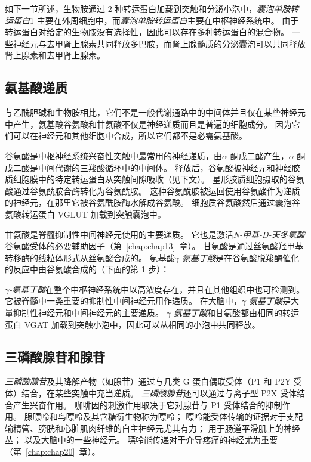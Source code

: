 如下一节所述，生物胺通过 2 种转运蛋白加载到突触和分泌小泡中，\textit{囊泡单胺转运蛋白}1 主要在外周细胞中，而\textit{囊泡单胺转运蛋白}主要在中枢神经系统中。
由于转运蛋白对给定的生物胺没有选择性，因此可以存在多种转运蛋白的混合物。
一些神经元与去甲肾上腺素共同释放多巴胺，而肾上腺髓质的分泌囊泡可以共同释放肾上腺素和去甲肾上腺素。



\subsection{氨基酸递质}

与乙酰胆碱和生物胺相比，它们不是一般代谢通路中的中间体并且仅在某些神经元中产生，氨基酸谷氨酸和甘氨酸不仅是神经递质而且是普遍的细胞成分。
因为它们可以在神经元和其他细胞中合成，所以它们都不是必需氨基酸。


谷氨酸是中枢神经系统兴奋性突触中最常用的神经递质，由$\alpha$-酮戊二酸产生，$\alpha$-酮戊二酸是中间代谢的三羧酸循环中的中间体。
释放后，谷氨酸被神经元和神经胶质细胞膜中的特定转运蛋白从突触间隙吸收（见下文）。
星形胶质细胞摄取的谷氨酸通过谷氨酰胺合酶转化为谷氨酰胺。
这种谷氨酰胺被运回使用谷氨酸作为递质的神经元，在那里它被谷氨酰胺酶水解成谷氨酸。
细胞质谷氨酸然后通过囊泡谷氨酸转运蛋白 VGLUT 加载到突触囊泡中。


甘氨酸是脊髓抑制性中间神经元使用的主要递质。
它也是激活\textit{N-甲基-D-天冬氨酸}谷氨酸受体的必要辅助因子（第~\ref{chap:chap13}~章）。
甘氨酸是通过丝氨酸羟甲基转移酶的线粒体形式从丝氨酸合成的。
氨基酸\textit{$\gamma$-氨基丁酸}是在谷氨酸脱羧酶催化的反应中由谷氨酸合成的（下面的第 1 步）：


\textit{$\gamma$-氨基丁酸}在整个中枢神经系统中以高浓度存在，并且在其他组织中也可检测到。
它被脊髓中一类重要的抑制性中间神经元用作递质。
在大脑中，\textit{$\gamma$-氨基丁酸}是大量抑制性神经元和中间神经元的主要递质。
\textit{$\gamma$-氨基丁酸}和甘氨酸都由相同的转运蛋白 VGAT 加载到突触小泡中，因此可以从相同的小泡中共同释放。



\subsection{三磷酸腺苷和腺苷}

\textit{三磷酸腺苷}及其降解产物（如腺苷）通过与几类 G 蛋白偶联受体（P1 和 P2Y 受体）结合，在某些突触中充当递质。
\textit{三磷酸腺苷}还可以通过与离子型 P2X 受体结合产生兴奋作用。
咖啡因的刺激作用取决于它对腺苷与 P1 受体结合的抑制作用。
腺嘌呤和鸟嘌呤及其含糖衍生物称为嘌呤；
嘌呤能受体传输的证据对于支配输精管、膀胱和心脏肌肉纤维的自主神经元尤其有力；
用于肠道平滑肌上的神经丛；
以及大脑中的一些神经元。
嘌呤能传递对于介导疼痛的神经尤为重要（第~\ref{chap:chap20}~章）。


